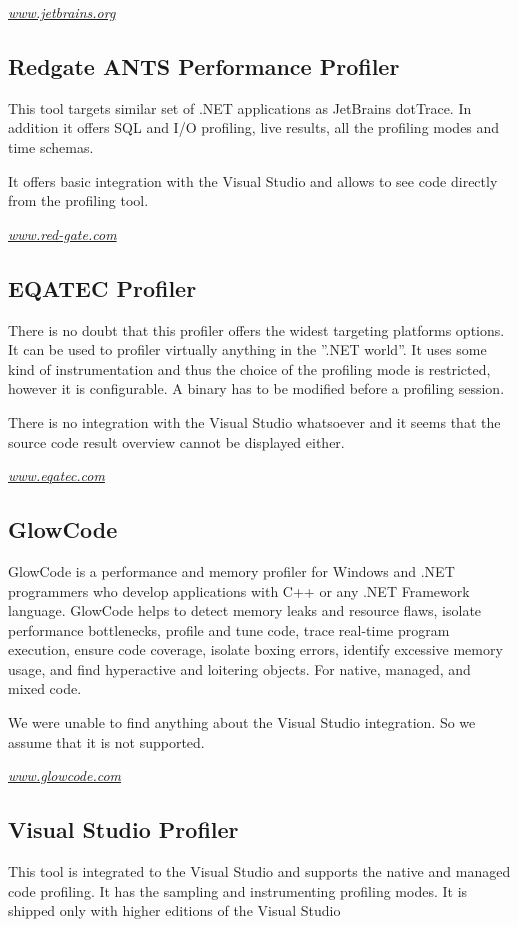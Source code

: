 \textit{\href{http://www.jetbrains.org}{www.jetbrains.org}	}

\subsection{Redgate ANTS Performance Profiler}
This tool targets similar set of .NET applications as JetBrains dotTrace. In addition it offers SQL and I/O  profiling, live results, all the profiling modes and time schemas. 

It offers basic integration with the Visual Studio and allows to see code directly from the profiling tool. 

\textit{\href{http://www.red-gate.com}{www.red-gate.com}}

\subsection{EQATEC Profiler}
There is no doubt that this profiler offers the widest targeting platforms options. It can be used to profiler virtually anything in the ''.NET world''. It uses some kind of instrumentation and thus the choice of the profiling mode is restricted, however it is configurable. A binary has to be modified before a profiling session.

There is no integration with the Visual Studio whatsoever and it seems that the source code result overview cannot be displayed either.

\textit{\href{http://www.eqatec.com}{www.eqatec.com}}

\subsection{GlowCode}
GlowCode is a performance and memory profiler for Windows and .NET programmers who develop applications with C++ or any .NET Framework language. GlowCode helps to detect memory leaks and resource flaws, isolate performance bottlenecks, profile and tune code, trace real-time program execution, ensure code coverage, isolate boxing errors, identify excessive memory usage, and find hyperactive and loitering objects. For native, managed, and mixed code. \cite{01GlowCodeWeb} 

We were unable to find anything about the Visual Studio integration. So we assume that it is not supported.


\textit{\href{http://www.glowcode.com/}{www.glowcode.com}}

\subsection{Visual Studio Profiler}
This tool is integrated to the Visual Studio and supports the native and managed code profiling. It has the sampling and instrumenting profiling modes. It is shipped only with higher editions of the Visual Studio

